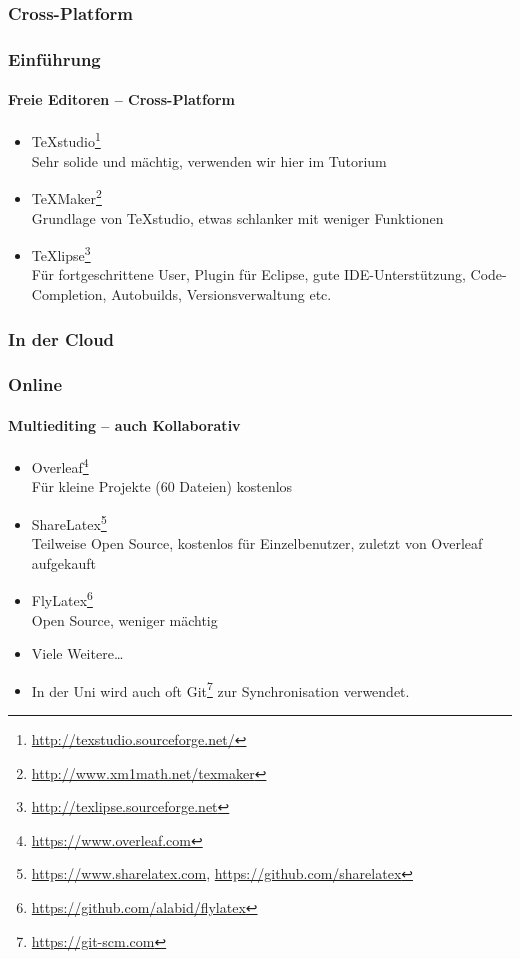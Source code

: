 \subsubsection{Cross-Platform}
\begin{frame}
\frametitle{Einführung}
\framesubtitle{Freie Editoren -- Cross-Platform}
\begin{itemize}
  \item TeXstudio\footnote{\url{http://texstudio.sourceforge.net/}}\\
  Sehr solide und mächtig, verwenden wir hier im Tutorium
  \item TeXMaker\footnote{\url{http://www.xm1math.net/texmaker}}\\
   Grundlage von TeXstudio, etwas schlanker mit weniger Funktionen
  \item TeXlipse\footnote{\url{http://texlipse.sourceforge.net}}\\ Für fortgeschrittene User, Plugin für
  Eclipse, gute IDE-Unterstützung, Code-Completion, Autobuilds, Versionsverwaltung etc.
\end{itemize}
\end{frame}


\subsubsection{In der Cloud}
\begin{frame}
\frametitle{Online}
\framesubtitle{Multiediting -- auch Kollaborativ}
\begin{itemize}
  \item Overleaf\footnote{\url{https://www.overleaf.com}}\\
  Für kleine Projekte (60 Dateien) kostenlos
  \item ShareLatex\footnote{\url{https://www.sharelatex.com}, \url{https://github.com/sharelatex}}\\
  Teilweise Open Source, kostenlos für Einzelbenutzer, zuletzt von Overleaf aufgekauft
  \item FlyLatex\footnote{\url{https://github.com/alabid/flylatex}}\\
  Open Source, weniger mächtig
  \item Viele Weitere\ldots
  \vspace{7mm}
  \item In der Uni wird auch oft Git\footnote{\url{https://git-scm.com}} zur Synchronisation verwendet.
\end{itemize}
\end{frame}


